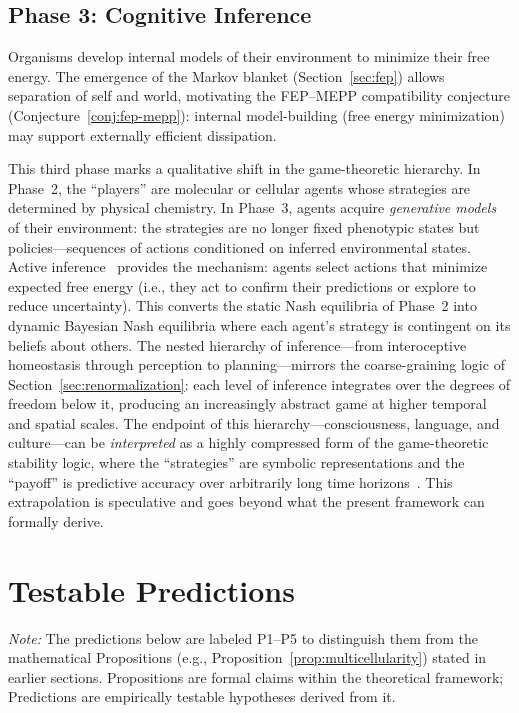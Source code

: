 \documentclass[12pt,a4paper]{article}
\theoremstyle{remark}
\begin{document}
\subsection{Phase 3: Cognitive Inference}

Organisms develop internal models of their environment to minimize their free energy. The emergence of the Markov blanket (Section~\ref{sec:fep}) allows separation of self and world, motivating the FEP--MEPP compatibility conjecture (Conjecture~\ref{conj:fep-mepp}): internal model-building (free energy minimization) may support externally efficient dissipation.

This third phase marks a qualitative shift in the game-theoretic hierarchy. In Phase~2, the ``players'' are molecular or cellular agents whose strategies are determined by physical chemistry. In Phase~3, agents acquire \emph{generative models} of their environment: the strategies are no longer fixed phenotypic states but policies---sequences of actions conditioned on inferred environmental states. Active inference~\citep{FristonFreeEnergy} provides the mechanism: agents select actions that minimize expected free energy (i.e., they act to confirm their predictions or explore to reduce uncertainty). This converts the static Nash equilibria of Phase~2 into dynamic Bayesian Nash equilibria where each agent's strategy is contingent on its beliefs about others. The nested hierarchy of inference---from interoceptive homeostasis through perception to planning---mirrors the coarse-graining logic of Section~\ref{sec:renormalization}: each level of inference integrates over the degrees of freedom below it, producing an increasingly abstract game at higher temporal and spatial scales. The endpoint of this hierarchy---consciousness, language, and culture---can be \emph{interpreted} as a highly compressed form of the game-theoretic stability logic, where the ``strategies'' are symbolic representations and the ``payoff'' is predictive accuracy over arbitrarily long time horizons~\citep{FristonPDF}. This extrapolation is speculative and goes beyond what the present framework can formally derive.

\section{Testable Predictions}
\label{sec:predictions}

\noindent\textit{Note:} The predictions below are labeled P1--P5 to distinguish them from the mathematical Propositions (e.g., Proposition~\ref{prop:multicellularity}) stated in earlier sections. Propositions are formal claims within the theoretical framework; Predictions are empirically testable hypotheses derived from it.
\end{document}
